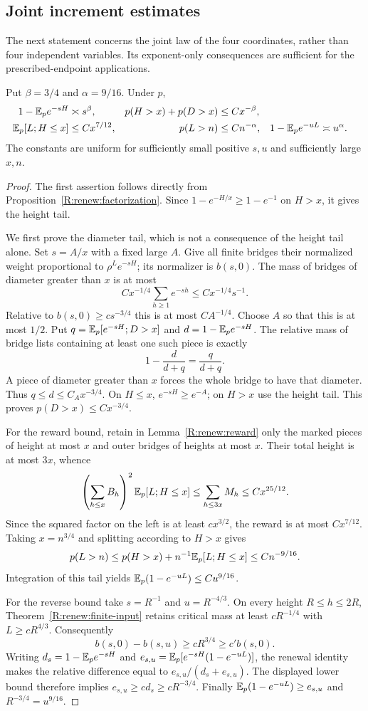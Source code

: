 \subsection{Joint increment estimates}
The next statement concerns the joint law of the four coordinates, rather than four independent variables. Its exponent-only consequences are sufficient for the prescribed-endpoint applications.
\begin{proposition}\label{R:renew:increments}
Put $\beta=3/4$ and $\alpha=9/16$. Under $p$,
\begin{align*}
 1-\mathbb E_p e^{-sH}&\asymp s^\beta,&
 p(H>x)+p(D>x)&\le Cx^{-\beta},\\
 \mathbb E_p[L;H\le x]&\le Cx^{7/12},&
 p(L>n)&\le Cn^{-\alpha},&
 1-\mathbb E_p e^{-uL}&\asymp u^\alpha.
\end{align*}
The constants are uniform for sufficiently small positive $s,u$ and sufficiently large $x,n$.
\end{proposition}
\begin{proof}
The first assertion follows directly from Proposition~\ref{R:renew:factorization}. Since $1-e^{-H/x}\ge1-e^{-1}$ on $H>x$, it gives the height tail.

We first prove the diameter tail, which is not a consequence of the height tail alone. Set $s=A/x$ with a fixed large $A$. Give all finite bridges their normalized weight proportional to $\rho^L e^{-sH}$; its normalizer is $b(s,0)$. The mass of bridges of diameter greater than $x$ is at most
\[
 Cx^{-1/4}\sum_{h\ge1}e^{-sh}\le Cx^{-1/4}s^{-1}.
\]
Relative to $b(s,0)\ge c s^{-3/4}$ this is at most $C A^{-1/4}$. Choose $A$ so that this is at most $1/2$. Put $q=\mathbb E_p[e^{-sH};D>x]$ and $d=1-\mathbb E_p e^{-sH}$. The relative mass of bridge lists containing at least one such piece is exactly
\[
 1-\frac{d}{d+q}=\frac{q}{d+q}.
\]
A piece of diameter greater than $x$ forces the whole bridge to have that diameter. Thus $q\le d\le C_Ax^{-3/4}$. On $H\le x$, $e^{-sH}\ge e^{-A}$; on $H>x$ use the height tail. This proves $p(D>x)\le Cx^{-3/4}$.

For the reward bound, retain in Lemma~\ref{R:renew:reward} only the marked pieces of height at most $x$ and outer bridges of heights at most $x$. Their total height is at most $3x$, whence
\[
 \left(\sum_{h\le x}B_h\right)^2\mathbb E_p[L;H\le x]
 \le\sum_{h\le3x}M_h\le Cx^{25/12}.
\]
Since the squared factor on the left is at least $cx^{3/2}$, the reward is at most $Cx^{7/12}$. Taking $x=n^{3/4}$ and splitting according to $H>x$ gives
\[
 p(L>n)\le p(H>x)+n^{-1}\mathbb E_p[L;H\le x]
 \le Cn^{-9/16}.
\]
Integration of this tail yields $\mathbb E_p(1-e^{-uL})\le Cu^{9/16}$.

For the reverse bound take $s=R^{-1}$ and $u=R^{-4/3}$. On every height $R\le h\le2R$, Theorem~\ref{R:renew:finite-input} retains critical mass at least $cR^{-1/4}$ with $L\ge cR^{4/3}$. Consequently
\[
 b(s,0)-b(s,u)\ge cR^{3/4}\ge c' b(s,0).
\]
Writing $d_s=1-\mathbb E_p e^{-sH}$ and
$e_{s,u}=\mathbb E_p[e^{-sH}(1-e^{-uL})]$, the renewal identity makes the relative difference equal to $e_{s,u}/(d_s+e_{s,u})$. The displayed lower bound therefore implies $e_{s,u}\ge c d_s\ge cR^{-3/4}$. Finally $\mathbb E_p(1-e^{-uL})\ge e_{s,u}$ and $R^{-3/4}=u^{9/16}$.
\end{proof}

